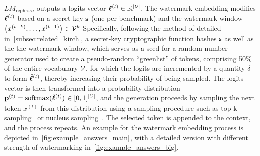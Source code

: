 $LM_{\text{rephrase}}$ outputs a logits vector $\boldsymbol{\ell}^{(t)} \in \mathbb{R}^{|\mathcal{V}|}$.
The watermark embedding modifies $\boldsymbol{\ell}^{(t)}$ based on a secret key $\mathsf{s}$ (one per benchmark) and the watermark window 
$\left( x^{(t-k)}, \ldots, x^{(t-1)} \right) \in \mathcal{V}^k$
Specifically, following the method of \citet{kirchenbauer2023reliability} detailed in~\ref{subsec:related_kirch}, a secret-key cryptographic function hashes $\mathsf{s}$ as well as the the watermark window, which serves as a seed for a random number generator used to create a pseudo-random ``greenlist'' of tokens, comprising 50\% of the entire vocabulary $\mathcal{V}$, for which the logits are incremented by a quantity $\delta$ to form $\Tilde{\boldsymbol{\ell}}^{(t)}$, thereby increasing their probability of being sampled.
The logits vector is then transformed into a probability distribution $\mathbf{p}^{(t)} = \text{softmax}(\Tilde{\boldsymbol{\ell}}^{(t)}) \in [0,1]^{|\mathcal{V}|}$, and the generation proceeds by sampling the next token $x^{(t)}$ from this distribution using a sampling procedure such as top-k sampling~\citep{fan2018hierarchical} or nucleus sampling~\citep{holtzman2019curious}.
The selected token is appended to the context, and the process repeats.
An example for the watermark embedding process is depicted in~\autoref{fig:example_answers_main}, with a detailed version with different strength of watermarking in~\autoref{fig:example_answers_big}.




